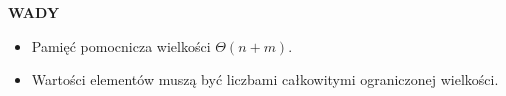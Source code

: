 \documentclass[advanced-sorts.tex]{subfiles}
\begin{document}

    \textbf{WADY}
    \begin{itemize}
        \item Pamięć pomocnicza wielkości $\Theta(n + m)$.
        \item Wartości elementów muszą być liczbami całkowitymi ograniczonej
            wielkości.
    \end{itemize}

\end{document}
